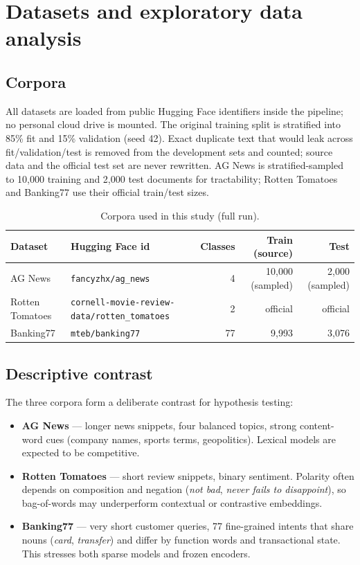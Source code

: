\section{Datasets and exploratory data analysis}

\subsection{Corpora}

All datasets are loaded from public Hugging Face identifiers inside the pipeline; no personal cloud drive is mounted. The original training split is stratified into 85\% fit and 15\% validation (seed 42). Exact duplicate text that would leak across fit/validation/test is removed from the development sets and counted; source data and the official test set are never rewritten. AG News is stratified-sampled to 10{,}000 training and 2{,}000 test documents for tractability; Rotten Tomatoes and Banking77 use their official train/test sizes.

\begin{table}[H]
\centering
\caption{Corpora used in this study (full run).}
\small
\begin{tabular}{@{}llrrr@{}}
\toprule
Dataset & Hugging Face id & Classes & Train (source) & Test \\
\midrule
AG News & \texttt{fancyzhx/ag\_news} & 4 & 10{,}000 (sampled) & 2{,}000 (sampled) \\
Rotten Tomatoes & \texttt{cornell-movie-review-data/rotten\_tomatoes} & 2 & official & official \\
Banking77 & \texttt{mteb/banking77} & 77 & 9{,}993 & 3{,}076 \\
\bottomrule
\end{tabular}
\end{table}

\subsection{Descriptive contrast}

The three corpora form a deliberate contrast for hypothesis testing:

\begin{itemize}
  \item \textbf{AG News} --- longer news snippets, four balanced topics, strong content-word cues (company names, sports terms, geopolitics). Lexical models are expected to be competitive.
  \item \textbf{Rotten Tomatoes} --- short review snippets, binary sentiment. Polarity often depends on composition and negation (\textit{not bad}, \textit{never fails to disappoint}), so bag-of-words may underperform contextual or contrastive embeddings.
  \item \textbf{Banking77} --- very short customer queries, 77 fine-grained intents that share nouns (\textit{card}, \textit{transfer}) and differ by function words and transactional state. This stresses both sparse models and frozen encoders.
\end{itemize}

